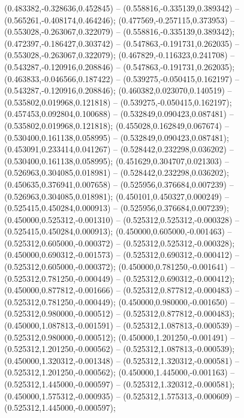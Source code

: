  (0.483382,-0.328636,0.452845) -- (0.558816,-0.335139,0.389342) -- (0.565261,-0.408174,0.464246);
 (0.477569,-0.257115,0.373953) -- (0.553028,-0.263067,0.322079) -- (0.558816,-0.335139,0.389342);
 (0.472397,-0.186427,0.303742) -- (0.547863,-0.191731,0.262035) -- (0.553028,-0.263067,0.322079);
 (0.467829,-0.116323,0.241708) -- (0.543287,-0.120916,0.208846) -- (0.547863,-0.191731,0.262035);
 (0.463833,-0.046566,0.187422) -- (0.539275,-0.050415,0.162197) -- (0.543287,-0.120916,0.208846);
 (0.460382,0.023070,0.140519) -- (0.535802,0.019968,0.121818) -- (0.539275,-0.050415,0.162197);
 (0.457453,0.092804,0.100688) -- (0.532849,0.090423,0.087481) -- (0.535802,0.019968,0.121818);
 (0.455028,0.162849,0.067674) -- (0.530400,0.161138,0.058995) -- (0.532849,0.090423,0.087481);
 (0.453091,0.233414,0.041267) -- (0.528442,0.232298,0.036202) -- (0.530400,0.161138,0.058995);
 (0.451629,0.304707,0.021303) -- (0.526963,0.304085,0.018981) -- (0.528442,0.232298,0.036202);
 (0.450635,0.376941,0.007658) -- (0.525956,0.376684,0.007239) -- (0.526963,0.304085,0.018981);
 (0.450101,0.450327,0.000249) -- (0.525415,0.450284,0.000913) -- (0.525956,0.376684,0.007239);
 (0.450000,0.525312,-0.001310) -- (0.525312,0.525312,-0.000328) -- (0.525415,0.450284,0.000913);
 (0.450000,0.605000,-0.001463) -- (0.525312,0.605000,-0.000372) -- (0.525312,0.525312,-0.000328);
 (0.450000,0.690312,-0.001573) -- (0.525312,0.690312,-0.000412) -- (0.525312,0.605000,-0.000372);
 (0.450000,0.781250,-0.001641) -- (0.525312,0.781250,-0.000449) -- (0.525312,0.690312,-0.000412);
 (0.450000,0.877812,-0.001666) -- (0.525312,0.877812,-0.000483) -- (0.525312,0.781250,-0.000449);
 (0.450000,0.980000,-0.001650) -- (0.525312,0.980000,-0.000512) -- (0.525312,0.877812,-0.000483);
 (0.450000,1.087813,-0.001591) -- (0.525312,1.087813,-0.000539) -- (0.525312,0.980000,-0.000512);
 (0.450000,1.201250,-0.001491) -- (0.525312,1.201250,-0.000562) -- (0.525312,1.087813,-0.000539);
 (0.450000,1.320312,-0.001348) -- (0.525312,1.320312,-0.000581) -- (0.525312,1.201250,-0.000562);
 (0.450000,1.445000,-0.001163) -- (0.525312,1.445000,-0.000597) -- (0.525312,1.320312,-0.000581);
 (0.450000,1.575312,-0.000935) -- (0.525312,1.575313,-0.000609) -- (0.525312,1.445000,-0.000597);
